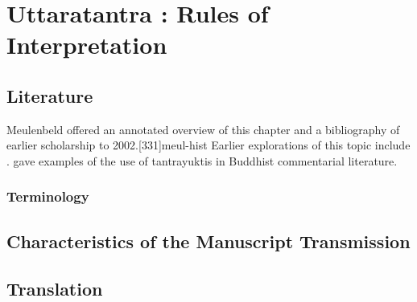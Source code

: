 
\chapter{Uttaratantra :  Rules of Interpretation}

\section{Literature} 

Meulenbeld offered an annotated overview of this chapter and a bibliography
of earlier scholarship to 2002.[331]{meul-hist}  Earlier explorations 
of this topic include \cite{dasg-1952,
lele-1981,
mejo-2000,
nara-1949,
ober-1967,
scha-1993,
sing-2003,
muth-1976}. 
\citet{mane-2008} gave examples of the use of tantrayuktis in Buddhist 
commentarial literature.

\subsection{Terminology}



\section{Characteristics of the Manuscript Transmission}


\section{Translation}

